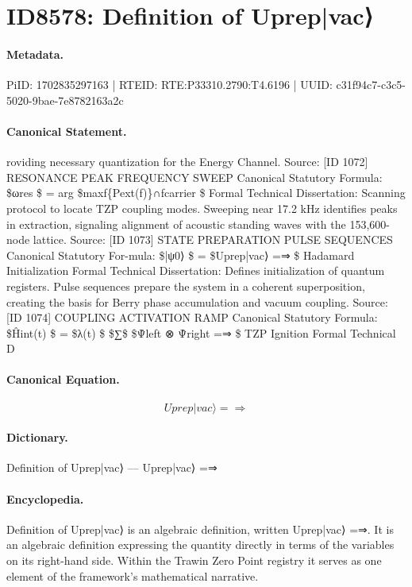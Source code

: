 \section*{ID8578: Definition of Uprep|vac⟩}
\paragraph{Metadata.}
PiID: 1702835297163 | RTEID: RTE:P33310.2790:T4.6196 | UUID: c31f94c7-c3c5-5020-9bae-7e8782163a2c

\paragraph{Canonical Statement.}
roviding necessary quantization for the Energy Channel. Source: [ID 1072] RESONANCE PEAK FREQUENCY SWEEP Canonical Statutory Formula: \$ωres \$ = arg \$maxf\{Pext(f)\}∩fcarrier \$ Formal Technical Dissertation: Scanning protocol to locate TZP coupling modes. Sweeping near 17.2 kHz identifies peaks in extraction, signaling alignment of acoustic standing waves with the 153,600-node lattice. Source: [ID 1073] STATE PREPARATION PULSE SEQUENCES Canonical Statutory For-mula: \$|ψ0⟩ \$ = \$Uprep|vac⟩ =⇒ \$ Hadamard Initialization Formal Technical Dissertation: Defines initialization of quantum registers. Pulse sequences prepare the system in a coherent superposition, creating the basis for Berry phase accumulation and vacuum coupling. Source: [ID 1074] COUPLING ACTIVATION RAMP Canonical Statutory Formula: \$Ĥint(t) \$ = \$λ(t) \$ \$∑\$ \$Ψ̂left ⊗ Ψ̂right =⇒ \$ TZP Ignition Formal Technical D

\paragraph{Canonical Equation.}
\[
Uprep|vac⟩ =⇒
\]

\paragraph{Dictionary.}
Definition of Uprep|vac⟩ — Uprep|vac⟩ =⇒

\paragraph{Encyclopedia.}
Definition of Uprep|vac⟩ is an algebraic definition, written Uprep|vac⟩ =⇒. It is an algebraic definition expressing the quantity directly in terms of the variables on its right-hand side. Within the Trawin Zero Point registry it serves as one element of the framework's mathematical narrative.

